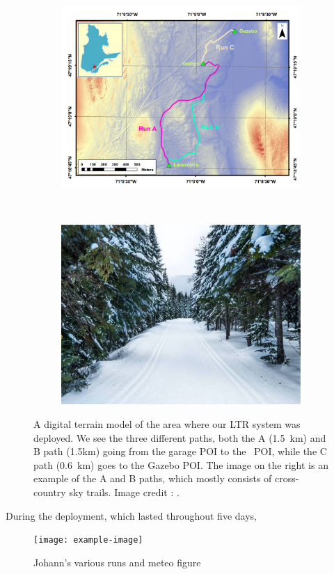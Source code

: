 \begin{figure}[htpb]
	\begin{center}
		\begin{subfigure}[b]{0.45\textwidth}
			\includegraphics[width=\linewidth]{figs/fm_mnt.png}
			\label{fig:view_above}
		\end{subfigure}%
		~~
		\begin{subfigure}[b]{0.45\textwidth}
			\includegraphics[width=\linewidth]{figs/foret-montmorency-path.pdf}
			\label{fig:view_path}
		\end{subfigure}%
		\caption{A digital terrain model of the area where our \ac{LTR} system was deployed.
		We see the three different paths, both the A (\SI{1.5}{km}) and B path ({1.5}{km}) going from the garage \ac{POI} to the \laverdiere~\ac{POI}, while the C path (\SI{0.6}{km}) goes to the Gazebo \ac{POI}.
		The image on the right is an example of the A and B paths, which mostly consists of cross-country sky trails.
		Image credit : \foretmo.} 
		\label{fig:forest}
	\end{center}
\end{figure}

During the deployment, which lasted throughout five days, 

\begin{figure} [htpb]
	\centering
	\texttt{[image: example-image]}
	\caption{Johann's various runs and meteo figure}
	\label{fig:meteo_runs}
\end{figure}

\lightlipsum[1]